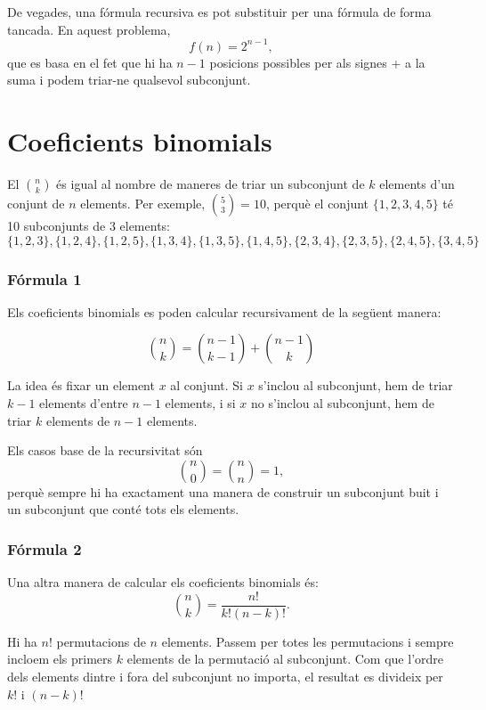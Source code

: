 De vegades, una fórmula recursiva es pot substituir per una fórmula de
forma tancada. En aquest problema,
\[
f(n)=2^{n-1},
\]
que es basa en el fet que hi ha $n-1$ posicions possibles per als
signes + a la suma i podem triar-ne qualsevol subconjunt.

\section{Coeficients binomials}


El  ${n \choose k}$ és igual al nombre de
maneres de triar un subconjunt de $k$ elements d'un conjunt de $n$
elements. Per exemple, ${5 \choose 3}=10$, perquè el conjunt
$\{1,2,3,4,5\}$ té 10 subconjunts de 3 elements: \[ \{1,2,3\} ,
\{1,2,4\}, \{1,2,5\}, \{1,3,4\}, \{1,3,5\}, \{1,4,5\} , \{2,3,4\},
\{2,3,5\}, \{2,4,5\}, \{3,4,5\} \]

\subsubsection{Fórmula 1}

Els coeficients binomials es poden calcular recursivament de la
següent manera:

\[
{n \choose k}  =  {n-1 \choose k-1} + {n-1 \choose k}
\]

La idea és fixar un element $x$ al conjunt. Si $x$ s'inclou al
subconjunt, hem de triar $k-1$ elements d'entre $n-1$ elements, i si
$x$ no s'inclou al subconjunt, hem de triar $k$ elements de $n-1$
elements.

Els casos base de la recursivitat són
\[
{n \choose 0}  =  {n \choose n} = 1,
\]
perquè sempre hi ha exactament una manera de construir un subconjunt
buit i un subconjunt que conté tots els elements.

\subsubsection{Fórmula 2}

Una altra manera de calcular els coeficients binomials és:
\[
{n \choose k}  =  \frac{n!}{k!(n-k)!}.
\]


Hi ha $n!$ permutacions de $n$ elements. Passem per totes les
permutacions i sempre incloem els primers $k$ elements de la
permutació al subconjunt. Com que l'ordre dels elements dintre i fora
del subconjunt no importa, el resultat es divideix per $k!$ i
$(n-k)!$

